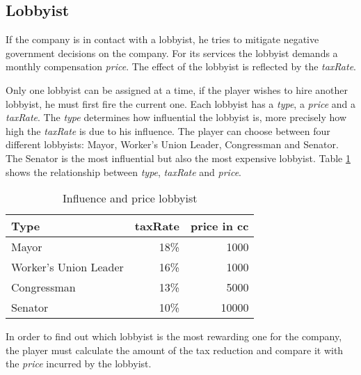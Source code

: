 \subsection{Lobbyist} \label{lobbyist_simulation}

If the company is in contact with a lobbyist, he tries to mitigate negative government decisions on the company. For its services the lobbyist demands a monthly compensation \textit{price}. The effect of the lobbyist is reflected by the \textit{taxRate}. 

Only one lobbyist can be assigned at a time, if the player wishes to hire another lobbyist, he must first fire the current one. Each lobbyist has a \textit{type}, a \textit{price} and a \textit{taxRate}. The \textit{type} determines how influential the lobbyist is, more precisely how high the \textit{taxRate} is due to his influence. The player can choose between four different lobbyists: Mayor, Worker’s Union Leader, Congressman and Senator. The Senator is the most influential but also the most expensive lobbyist. Table \ref{influence_lobbyist} shows the relationship between \textit{type}, \textit{taxRate} and \textit{price}. 

\begin{table}[ht]
\centering
\begin{tabular}{|l|r|r|}
\hline
Type                    & taxRate   & price in cc \\ \hline
Mayor                   & 18\%      & 1000     \\
Worker's Union Leader   & 16\%      & 1000     \\
Congressman             & 13\%      & 5000     \\
Senator                 & 10\%      & 10000     \\
\hline
\end{tabular}
\caption{Influence and price lobbyist}
\label{influence_lobbyist}
\end{table}

In order to find out which lobbyist is the most rewarding one for the company, the player must calculate the amount of the tax reduction and compare it with the \textit{price} incurred by the lobbyist.
 



 




